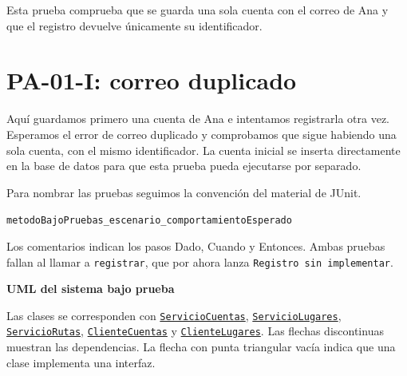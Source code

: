 \documentclass[10pt,a4paper]{article}
\newcommand{\codigo}[2]{\href{https://github.com/Kiliansito/ei1039-ei1048-movilidad/blob/690589d1720a82e6f1e3c92eddd7acc4274bda91/#1}{\texttt{\small #2}}}
\begin{document}
Esta prueba comprueba que se guarda una sola cuenta con el correo de Ana y que el registro devuelve únicamente su identificador.

\section*{PA-01-I: correo duplicado}


Aquí guardamos primero una cuenta de Ana e intentamos registrarla otra vez. Esperamos el error de correo duplicado y comprobamos que sigue habiendo una sola cuenta, con el mismo identificador. La cuenta inicial se inserta directamente en la base de datos para que esta prueba pueda ejecutarse por separado.

Para nombrar las pruebas seguimos la convención del material de JUnit.
\par\texttt{metodoBajoPruebas\_escenario\_comportamientoEsperado}\par
Los comentarios indican los pasos Dado, Cuando y Entonces. Ambas pruebas fallan al llamar a \texttt{registrar}, que por ahora lanza \texttt{Registro sin implementar}.

\newpage
{\LARGE\bfseries UML del sistema bajo prueba}\par
Las clases se corresponden con \codigo{src/ServicioCuentas.ts}{ServicioCuentas},
\codigo{src/ServicioLugares.ts}{ServicioLugares},
\codigo{src/ServicioRutas.ts}{ServicioRutas},
\codigo{src/ClienteCuentas.ts}{ClienteCuentas} y
\codigo{src/ClienteLugares.ts}{ClienteLugares}.
Las flechas discontinuas muestran las dependencias. La flecha con punta triangular vacía indica que una clase implementa una interfaz.
\end{document}

